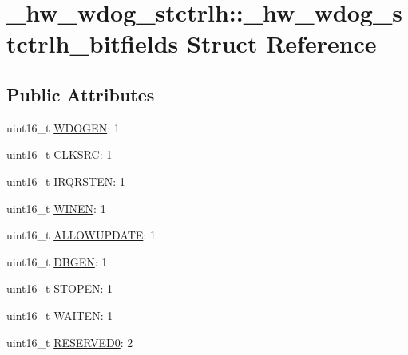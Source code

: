 \hypertarget{struct__hw__wdog__stctrlh_1_1__hw__wdog__stctrlh__bitfields}{}\section{\+\_\+hw\+\_\+wdog\+\_\+stctrlh\+:\+:\+\_\+hw\+\_\+wdog\+\_\+stctrlh\+\_\+bitfields Struct Reference}
\label{struct__hw__wdog__stctrlh_1_1__hw__wdog__stctrlh__bitfields}
\subsection*{Public Attributes}
\begin{DoxyCompactItemize}
\item 
uint16\+\_\+t \hyperlink{struct__hw__wdog__stctrlh_1_1__hw__wdog__stctrlh__bitfields_a32e9251ef81b26856dee244fca122d79}{W\+D\+O\+G\+EN}\+: 1
\item 
uint16\+\_\+t \hyperlink{struct__hw__wdog__stctrlh_1_1__hw__wdog__stctrlh__bitfields_a18ed69410730e1d8df9b335c0917b41c}{C\+L\+K\+S\+RC}\+: 1
\item 
uint16\+\_\+t \hyperlink{struct__hw__wdog__stctrlh_1_1__hw__wdog__stctrlh__bitfields_a2e52fa8efa99d7b0e0a30cd698ab52e1}{I\+R\+Q\+R\+S\+T\+EN}\+: 1
\item 
uint16\+\_\+t \hyperlink{struct__hw__wdog__stctrlh_1_1__hw__wdog__stctrlh__bitfields_aba8de54f986116eab099e9520db22ec6}{W\+I\+N\+EN}\+: 1
\item 
uint16\+\_\+t \hyperlink{struct__hw__wdog__stctrlh_1_1__hw__wdog__stctrlh__bitfields_a450540aa9c8b0d701c69cbb4c8e1f410}{A\+L\+L\+O\+W\+U\+P\+D\+A\+TE}\+: 1
\item 
uint16\+\_\+t \hyperlink{struct__hw__wdog__stctrlh_1_1__hw__wdog__stctrlh__bitfields_a60a81667d718bf21cecf6ec063cf1343}{D\+B\+G\+EN}\+: 1
\item 
uint16\+\_\+t \hyperlink{struct__hw__wdog__stctrlh_1_1__hw__wdog__stctrlh__bitfields_ae0c6719db25f0e6c4015bb9942dd075e}{S\+T\+O\+P\+EN}\+: 1
\item 
uint16\+\_\+t \hyperlink{struct__hw__wdog__stctrlh_1_1__hw__wdog__stctrlh__bitfields_a872e6c348c6dde5399c32ec247561ea0}{W\+A\+I\+T\+EN}\+: 1
\item 
uint16\+\_\+t \hyperlink{struct__hw__wdog__stctrlh_1_1__hw__wdog__stctrlh__bitfields_a7b1a5d7ba96e5e84753b2419cc48b3c8}{R\+E\+S\+E\+R\+V\+E\+D0}\+: 2
\item 

\end{DoxyCompactItemize}
